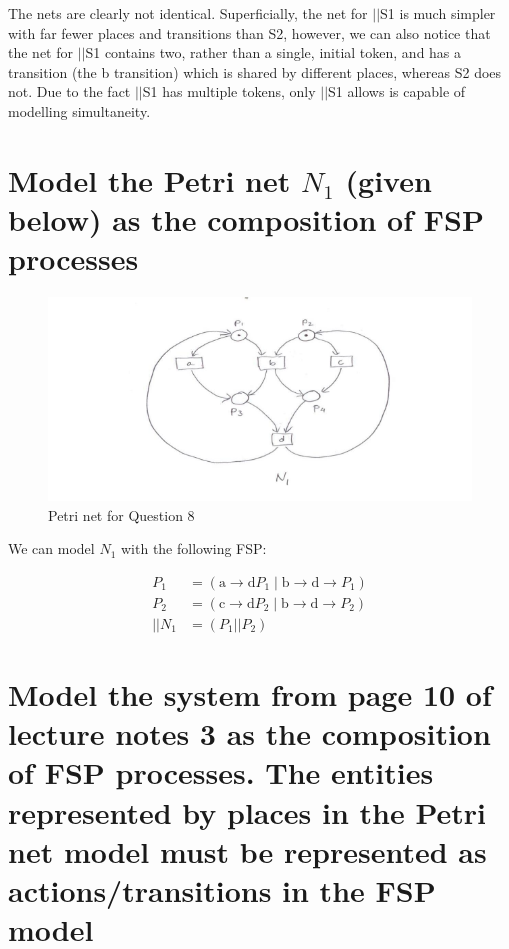 \documentclass{article}[8pt]
\begin{document}
The nets are clearly not identical. Superficially, the net for $||$S1 is much simpler with far fewer places and transitions than S2, however, we can also notice that the net for $||$S1 contains two, rather than a single, initial token, and has a transition (the b transition) which is shared by different places, whereas S2 does not. Due to the fact $||$S1 has multiple tokens, only $||$S1 allows is capable of modelling simultaneity.

\section[Question ~\thesection]{Model the Petri net $N_1$ (given below) as the composition of FSP processes}

\begin{figure}[H]
	\includegraphics[width=\linewidth]{./imgs/Question-8.png}
	\caption{Petri net for Question 8}
	\label{fig:Question-8}
\end{figure}

We can model $N_1$ with the following FSP:

\begin{align*}
	P_1 &= (\text{a} \rightarrow \text{d} P_1 \; | \; \text{b} \rightarrow \text{d} \rightarrow P_1) \\
	P_2 &= (\text{c} \rightarrow \text{d} P_2 \; | \; \text{b} \rightarrow \text{d} \rightarrow P_2) \\
	||N_1 &= (P_1||P_2)
\end{align*}

\section[Question ~\thesection]{Model the system from page 10 of lecture notes 3 as the composition of FSP processes. The entities represented by places in the Petri net model must be represented as actions/transitions in the FSP model}
\end{document}
